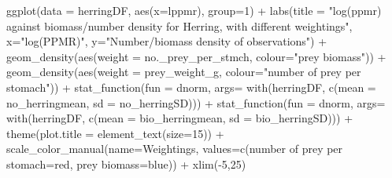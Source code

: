 \documentclass[
]{article}
\newenvironment{Shaded}{\begin{snugshade}}{\end{snugshade}}
\newcommand{\AttributeTok}[1]{\textcolor[rgb]{0.77,0.63,0.00}{#1}}
\newcommand{\DecValTok}[1]{\textcolor[rgb]{0.00,0.00,0.81}{#1}}
\newcommand{\FunctionTok}[1]{\textcolor[rgb]{0.00,0.00,0.00}{#1}}
\newcommand{\NormalTok}[1]{#1}
\newcommand{\OtherTok}[1]{\textcolor[rgb]{0.56,0.35,0.01}{#1}}
\newcommand{\SpecialCharTok}[1]{\textcolor[rgb]{0.00,0.00,0.00}{#1}}
\newcommand{\StringTok}[1]{\textcolor[rgb]{0.31,0.60,0.02}{#1}}
\begin{document}
\begin{Shaded}
\begin{Highlighting}[]
\FunctionTok{ggplot}\NormalTok{(}\AttributeTok{data =}\NormalTok{ herringDF, }\FunctionTok{aes}\NormalTok{(}\AttributeTok{x=}\NormalTok{lppmr), }\AttributeTok{group=}\DecValTok{1}\NormalTok{) }\SpecialCharTok{+} 
          \FunctionTok{labs}\NormalTok{(}\AttributeTok{title =} \StringTok{"log(ppmr) against biomass/number density for Herring,}
\StringTok{               with different weightings"}\NormalTok{,}
               \AttributeTok{x=}\StringTok{"log(PPMR)"}\NormalTok{, }\AttributeTok{y=}\StringTok{"Number/biomass density of observations"}\NormalTok{) }\SpecialCharTok{+}
          \FunctionTok{geom\_density}\NormalTok{(}\FunctionTok{aes}\NormalTok{(}\AttributeTok{weight =}\NormalTok{ no.\_prey\_per\_stmch, }\AttributeTok{colour=}\StringTok{"prey biomass"}\NormalTok{)) }\SpecialCharTok{+} 
          \FunctionTok{geom\_density}\NormalTok{(}\FunctionTok{aes}\NormalTok{(}\AttributeTok{weight =}\NormalTok{ prey\_weight\_g, }\AttributeTok{colour=}\StringTok{"number of prey per stomach"}\NormalTok{)) }\SpecialCharTok{+} 
          \FunctionTok{stat\_function}\NormalTok{(}\AttributeTok{fun =}\NormalTok{ dnorm, }\AttributeTok{args=} \FunctionTok{with}\NormalTok{(herringDF, }\FunctionTok{c}\NormalTok{(}\AttributeTok{mean =}\NormalTok{ no\_herringmean, }\AttributeTok{sd =}\NormalTok{ no\_herringSD))) }\SpecialCharTok{+}
          \FunctionTok{stat\_function}\NormalTok{(}\AttributeTok{fun =}\NormalTok{ dnorm, }\AttributeTok{args=} \FunctionTok{with}\NormalTok{(herringDF, }\FunctionTok{c}\NormalTok{(}\AttributeTok{mean =}\NormalTok{ bio\_herringmean, }\AttributeTok{sd =}\NormalTok{ bio\_herringSD))) }\SpecialCharTok{+}
          \FunctionTok{theme}\NormalTok{(}\AttributeTok{plot.title =} \FunctionTok{element\_text}\NormalTok{(}\AttributeTok{size=}\DecValTok{15}\NormalTok{)) }\SpecialCharTok{+}
          \FunctionTok{scale\_color\_manual}\NormalTok{(}\AttributeTok{name=}\StringTok{\textquotesingle{}Weightings\textquotesingle{}}\NormalTok{,}
                     \AttributeTok{values=}\FunctionTok{c}\NormalTok{(}\StringTok{\textquotesingle{}number of prey per stomach\textquotesingle{}}\OtherTok{=}\StringTok{\textquotesingle{}red\textquotesingle{}}\NormalTok{, }\StringTok{\textquotesingle{}prey biomass\textquotesingle{}}\OtherTok{=}\StringTok{\textquotesingle{}blue\textquotesingle{}}\NormalTok{)) }\SpecialCharTok{+}
        \FunctionTok{xlim}\NormalTok{(}\SpecialCharTok{{-}}\DecValTok{5}\NormalTok{,}\DecValTok{25}\NormalTok{) }
\end{Highlighting}
\end{Shaded}
\end{document}
